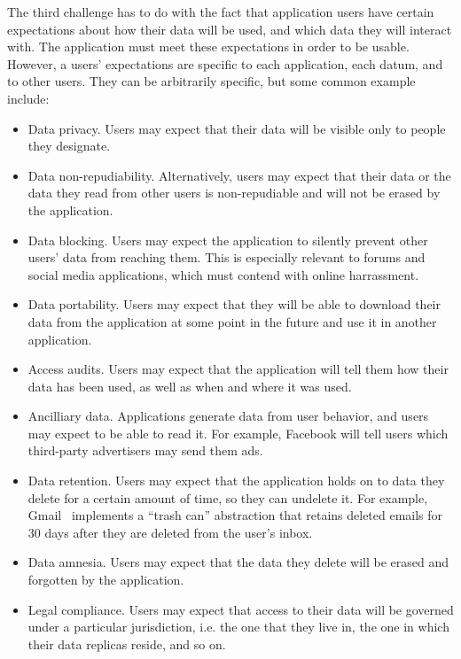 The third challenge has to do with the fact that application users have
certain expectations about how their data will be used, and which data
they will interact with.  The application must
meet these expectations in order to be usable.  However, a users' expectations are
specific to each application, each datum, and to other users.  They can be
arbitrarily specific, but some common example include:

\begin{itemize}
   \item Data privacy.  Users may expect that their data will be visible only to
      people they designate.
   \item Data non-repudiability.  Alternatively, users may expect that their
      data or the data they read from other users is non-repudiable and will not
      be erased by the application.
   \item Data blocking.  Users may expect the application to silently prevent
      other users' data from reaching them.  This is especially relevant to
      forums and social media applications, which must contend with online
      harrassment.
   \item Data portability.  Users may expect that they will be able to download
      their data from the application at some point in the future and use it in
      another application.
   \item Access audits.  Users may expect that the application will tell them
      how their data has been used, as well as when and where it was used.
   \item Ancilliary data.  Applications generate data from user behavior, and
      users may expect to be able to read it.  For example, Facebook will tell
      users which third-party advertisers may send them ads.
   \item Data retention.  Users may expect that the application holds on to data
      they delete for a certain amount of time, so they can undelete it.  For
      example, Gmail~\cite{gmail} implements a ``trash can'' abstraction that retains
      deleted emails for 30 days after they are deleted from the user's inbox.
   \item Data amnesia.  Users may expect that the data they delete will be
      erased and forgotten by the application.
   \item Legal compliance.  Users may expect that access to their data will be
      governed under a particular jurisdiction, i.e. the one that they live in,
      the one in which their data replicas reside, and so on.
\end{itemize}

